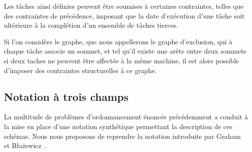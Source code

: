 Les tâches ainsi définies peuvent être soumises à certaines contraintes, telles que des contraintes
de précédence, imposant que la date d'exécution d'une tâche soit ultérieure à la complétion
d'un ensemble de tâches tierces.

Si l'on considère le graphe, que nous appellerons le graphe d'exclusion, qui à chaque tâche associe
un sommet, et tel qu'il existe une arête entre deux sommets si deux taches ne peuvent être affectée
à la même machine, il est alors possible d'imposer des contraintes structurelles à ce graphe. 

\subsection{Notation à trois champs}

La multitude de problèmes d'ordonnancement énoncée précédemment a conduit à la mise en place d'une
notation synthétique permettant la description de ces schémas. Nous nous proposons de reprendre la
notation introduite par Graham~\cite{graham} et B\l a\.zewicz~\cite{blazewicz}. 

